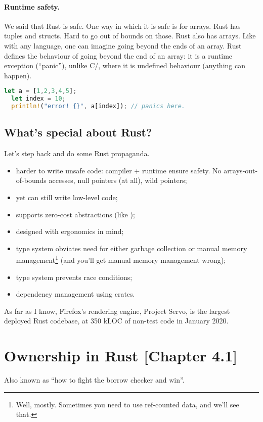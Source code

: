 \paragraph{Runtime safety.} We said that Rust is safe. One way in which it is safe is for
arrays. Rust has tuples and structs. Hard to go out of bounds on those. Rust also has arrays.
Like with any language, one can imagine going beyond the ends of an array. Rust defines
the behaviour of going beyond the end of an array: it is a runtime exception (``panic''),
unlike C/\CPP, where it is undefined behaviour (anything can happen).


\begin{lstlisting}[language=Rust]
  let a = [1,2,3,4,5];
  let index = 10;
  println!("error! {}", a[index]); // panics here.
\end{lstlisting}

\subsection*{What's special about Rust?}
Let's step back and do some Rust propaganda.
\begin{itemize}[noitemsep]
\item harder to write unsafe code: compiler + runtime ensure safety. No arrays-out-of-bounds accesses, null pointers (at all), wild pointers;
\item yet can still write low-level code;
\item supports zero-cost abstractions (like \CPP);
\item designed with ergonomics in mind;
\item type system obviates need for either garbage collection or manual memory management\footnote{Well, mostly. Sometimes you need to use ref-counted data, and we'll see that.} (and you'll get manual memory management wrong);
\item type system prevents race conditions;
\item dependency management using crates.
\end{itemize}
As far as I know, Firefox's rendering engine, Project Servo, is the largest deployed Rust codebase, at 350 kLOC of non-test code in January 2020.


\section*{Ownership in Rust [Chapter 4.1]}
Also known as ``how to fight the borrow checker and win''.


